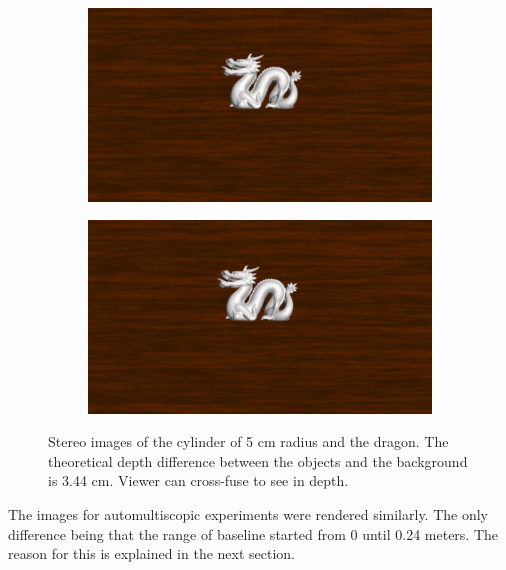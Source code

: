 \begin{figure}[htbp]
    \begin{subfigure}[b]{0.5\textwidth}
        \includegraphics[width=\textwidth]{./Template_Figures/57Ld.png}
        \caption{}\label{fig:left_stereo_dra}
    \end{subfigure}
    \begin{subfigure}[b]{0.5\textwidth}
        \includegraphics[width=\textwidth]{./Template_Figures/57Rd.png}
        \caption{}\label{fig:right_stereo_dra}
    \end{subfigure}
    \caption{Stereo images of the cylinder of 5 cm radius and the dragon. The theoretical depth difference between the objects and the background is 3.44 cm. Viewer can cross-fuse to see in depth.\label{fig:stimuli_stereo}}
\end{figure}

The images for automultiscopic experiments were rendered similarly. The only difference being that the range of baseline started from 0 until 0.24 meters. The reason for this is explained in the next section.

